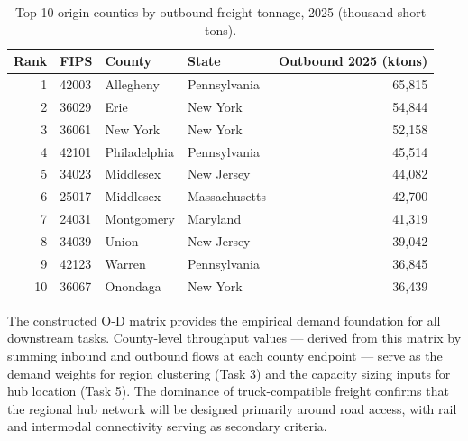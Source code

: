 \begin{table}[H]
\centering
\caption{Top 10 origin counties by outbound freight tonnage, 2025 (thousand short tons).}
\begin{tabular}{rlllr}
\toprule
Rank & FIPS & County & State & Outbound 2025 (ktons) \\
\midrule
1  & 42003 & Allegheny & Pennsylvania   & 65{,}815 \\
2  & 36029 & Erie      & New York       & 54{,}844 \\
3  & 36061 & New York  & New York       & 52{,}158 \\
4  & 42101 & Philadelphia & Pennsylvania & 45{,}514 \\
5  & 34023 & Middlesex & New Jersey     & 44{,}082 \\
6  & 25017 & Middlesex & Massachusetts  & 42{,}700 \\
7  & 24031 & Montgomery & Maryland      & 41{,}319 \\
8  & 34039 & Union     & New Jersey     & 39{,}042 \\
9  & 42123 & Warren    & Pennsylvania   & 36{,}845 \\
10 & 36067 & Onondaga  & New York       & 36{,}439 \\
\bottomrule
\end{tabular}
\label{tab:task1-top10}
\end{table}

The constructed O-D matrix provides the empirical demand foundation for all downstream
tasks. County-level throughput values — derived from this matrix by summing inbound and
outbound flows at each county endpoint — serve as the demand weights for region
clustering (Task 3) and the capacity sizing inputs for hub location (Task 5). The
dominance of truck-compatible freight confirms that the regional hub network will be
designed primarily around road access, with rail and intermodal connectivity serving
as secondary criteria.
